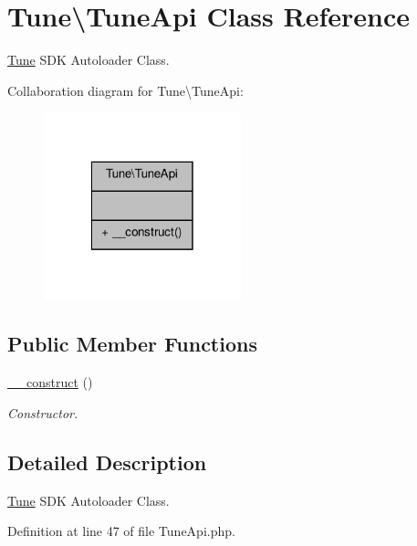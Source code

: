 \hypertarget{classTune_1_1TuneApi}{\section{Tune\textbackslash{}Tune\-Api Class Reference}
\label{classTune_1_1TuneApi}
}


\hyperlink{namespaceTune}{Tune} S\-D\-K Autoloader Class.  




Collaboration diagram for Tune\textbackslash{}Tune\-Api\-:
\nopagebreak
\begin{figure}[H]
\begin{center}
\leavevmode
\includegraphics[width=162pt]{classTune_1_1TuneApi__coll__graph}
\end{center}
\end{figure}
\subsection*{Public Member Functions}
\begin{DoxyCompactItemize}
\item 
\hyperlink{classTune_1_1TuneApi_a791d5db2d5d8dc835c4e1f3cfc7319b1}{\-\_\-\-\_\-construct} ()
\begin{DoxyCompactList}\small\item\em Constructor. \end{DoxyCompactList}\end{DoxyCompactItemize}


\subsection{Detailed Description}
\hyperlink{namespaceTune}{Tune} S\-D\-K Autoloader Class. 



Definition at line 47 of file Tune\-Api.\-php.



